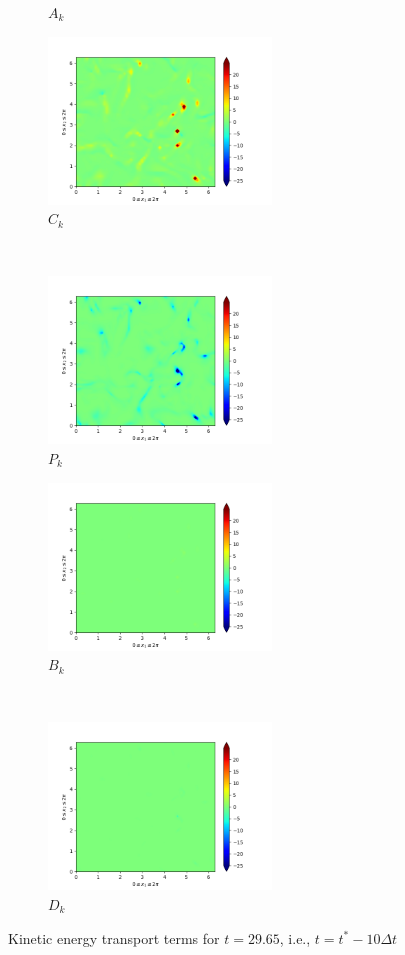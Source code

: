 \begin{figure}[H]
\begin{subfigure}{0.45\textwidth}
        \caption{$A_{k}$}
    \end{subfigure}
    \newline
    \begin{subfigure}{0.45\textwidth}
        \includegraphics[height=1.75in]{media/run-cds-65/C-ke-1330.png}
        \caption{$C_{k}$}
    \end{subfigure}
    ~
    \begin{subfigure}{0.45\textwidth}
        \includegraphics[height=1.75in]{media/run-cds-65/P-ke-1330.png}
        \caption{$P_{k}$}
    \end{subfigure}
    \newline
    \begin{subfigure}{0.45\textwidth}
        \includegraphics[height=1.75in]{media/run-cds-65/B-ke-1330.png}
        \caption{$B_{k}$}
    \end{subfigure}
    ~
    \begin{subfigure}{0.45\textwidth}
        \includegraphics[height=1.75in]{media/run-cds-65/D-ke-1330.png}
        \caption{$D_{k}$}
    \end{subfigure}
    \caption{Kinetic energy transport terms for $t=29.65$, i.e., $t=t^{\ast} - 10 \Delta t$}
\end{figure}

